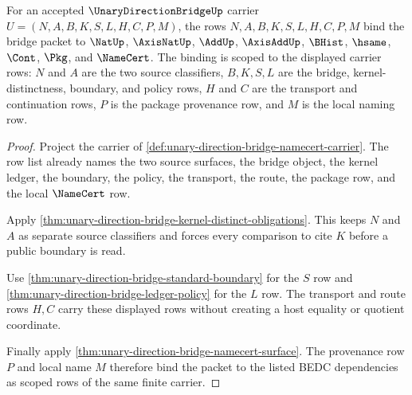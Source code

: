 \begin{theorem}
\label{thm:unary-direction-bridge-scoped-source-bindings}
For an accepted $\UnaryDirectionBridgeUp$ carrier $U=(N,A,B,K,S,L,H,C,P,M)$, the rows $N,A,B,K,S,L,H,C,P,M$ bind the bridge packet to $\NatUp$, $\AxisNatUp$, $\AddUp$, $\AxisAddUp$, $\BHist$, $\hsame$, $\Cont$, $\Pkg$, and $\NameCert$. The binding is scoped to the displayed carrier rows: $N$ and $A$ are the two source classifiers, $B,K,S,L$ are the bridge, kernel-distinctness, boundary, and policy rows, $H$ and $C$ are the transport and continuation rows, $P$ is the package provenance row, and $M$ is the local naming row.
\end{theorem}
\begin{proof}
Project the carrier of \autoref{def:unary-direction-bridge-namecert-carrier}. The row list already names the two source surfaces, the bridge object, the kernel ledger, the boundary, the policy, the transport, the route, the package row, and the local $\NameCert$ row.

Apply \autoref{thm:unary-direction-bridge-kernel-distinct-obligations}. This keeps $N$ and $A$ as separate source classifiers and forces every comparison to cite $K$ before a public boundary is read.

Use \autoref{thm:unary-direction-bridge-standard-boundary} for the $S$ row and \autoref{thm:unary-direction-bridge-ledger-policy} for the $L$ row. The transport and route rows $H,C$ carry these displayed rows without creating a host equality or quotient coordinate.

Finally apply \autoref{thm:unary-direction-bridge-namecert-surface}. The provenance row $P$ and local name $M$ therefore bind the packet to the listed BEDC dependencies as scoped rows of the same finite carrier.
\end{proof}

